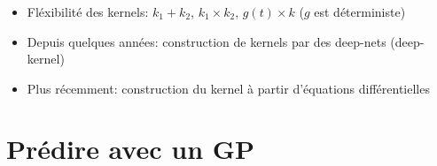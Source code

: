 \documentclass[xcolor=svgnames, t]{beamer}
\begin{document}
\begin{frame}
  \frametitle{\secname}
  \begin{itemize}
    \item Fléxibilité des kernels: $k_1 + k_2$, $k_1 \times k_2$, $g(t) \times k$ ($g$ est déterministe)
  \pause
    \item Depuis quelques années: construction de kernels par des deep-nets (deep-kernel)
  \pause
    \item Plus récemment: construction du kernel à  partir d'équations différentielles
  \end{itemize}
\end{frame}

\section{Prédire avec un GP}
\end{document}
